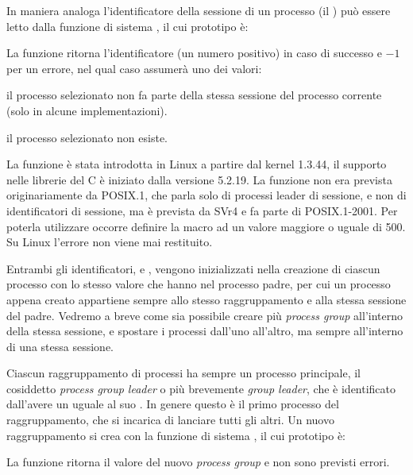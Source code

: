 In maniera analoga l'identificatore della sessione di un processo (il
) può essere letto dalla funzione di sistema , il cui
prototipo è:

\begin{funcproto}{
}

{La funzione ritorna l'identificatore (un numero positivo) in caso di successo
  e $-1$ per un errore, nel qual caso  assumerà uno dei valori:
  \begin{errlist}
    \item[\errcode{EPERM}] il processo selezionato non fa parte della stessa
      sessione del processo corrente (solo in alcune implementazioni).
    \item[\errcode{ESRCH}] il processo selezionato non esiste.
  \end{errlist}
}
\end{funcproto}

La funzione è stata introdotta in Linux a partire dal kernel 1.3.44, il
supporto nelle librerie del C è iniziato dalla versione 5.2.19. La funzione
non era prevista originariamente da POSIX.1, che parla solo di processi leader
di sessione, e non di identificatori di sessione, ma è prevista da SVr4 e fa
parte di POSIX.1-2001.  Per poterla utilizzare occorre definire la macro
 ad un valore maggiore o uguale di 500. Su Linux
l'errore  non viene mai restituito.

Entrambi gli identificatori,  e , vengono inizializzati
nella creazione di ciascun processo con lo stesso valore che hanno nel
processo padre, per cui un processo appena creato appartiene sempre allo
stesso raggruppamento e alla stessa sessione del padre. Vedremo a breve come
sia possibile creare più \textit{process group} all'interno della stessa
sessione, e spostare i processi dall'uno all'altro, ma sempre all'interno di
una stessa sessione.

Ciascun raggruppamento di processi ha sempre un processo principale, il
cosiddetto  \textit{process group leader} o più
brevemente \textit{group leader}, che è identificato dall'avere un 
uguale al suo . In genere questo è il primo processo del
raggruppamento, che si incarica di lanciare tutti gli altri. Un nuovo
raggruppamento si crea con la funzione di sistema , il cui
prototipo è:

\begin{funcproto}{
}

{La funzione ritorna il valore del nuovo \textit{process group} e non sono
  previsti errori.}
\end{funcproto}

